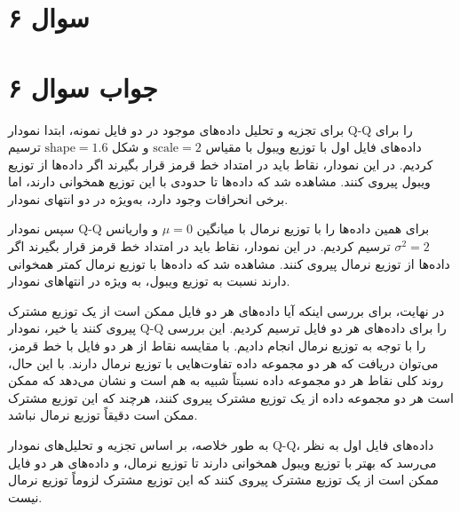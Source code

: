 \section*{سوال ۶}



\section*{جواب سوال ۶}


برای تجزیه و تحلیل داده‌های موجود در دو فایل نمونه، ابتدا نمودار Q-Q را برای داده‌های فایل اول با توزیع ویبول با مقیاس \( \text{scale} = 2 \) و شکل \( \text{shape} = 1.6 \) ترسیم کردیم. در این نمودار، نقاط باید در امتداد خط قرمز قرار بگیرند اگر داده‌ها از توزیع ویبول پیروی کنند. مشاهده شد که داده‌ها تا حدودی با این توزیع همخوانی دارند، اما برخی انحرافات وجود دارد، به‌ویژه در دو انتهای نمودار.

سپس نمودار Q-Q برای همین داده‌ها را با توزیع نرمال با میانگین \( \mu = 0 \) و واریانس \( \sigma^2 = 2 \) ترسیم کردیم. در این نمودار، نقاط باید در امتداد خط قرمز قرار بگیرند اگر داده‌ها از توزیع نرمال پیروی کنند. مشاهده شد که داده‌ها با توزیع نرمال کمتر همخوانی دارند نسبت به توزیع ویبول، به ویژه در انتهاهای نمودار.

در نهایت، برای بررسی اینکه آیا داده‌های هر دو فایل ممکن است از یک توزیع مشترک پیروی کنند یا خیر، نمودار Q-Q را برای داده‌های هر دو فایل ترسیم کردیم. این بررسی را با توجه به توزیع نرمال انجام دادیم. با مقایسه نقاط از هر دو فایل با خط قرمز، می‌توان دریافت که هر دو مجموعه داده تفاوت‌هایی با توزیع نرمال دارند. با این حال، روند کلی نقاط هر دو مجموعه داده نسبتاً شبیه به هم است و نشان می‌دهد که ممکن است هر دو مجموعه داده از یک توزیع مشترک پیروی کنند، هرچند که این توزیع مشترک ممکن است دقیقاً توزیع نرمال نباشد.

به طور خلاصه، بر اساس تجزیه و تحلیل‌های نمودار Q-Q، داده‌های فایل اول به نظر می‌رسد که بهتر با توزیع ویبول همخوانی دارند تا توزیع نرمال، و داده‌های هر دو فایل ممکن است از یک توزیع مشترک پیروی کنند که این توزیع مشترک لزوماً توزیع نرمال نیست.

